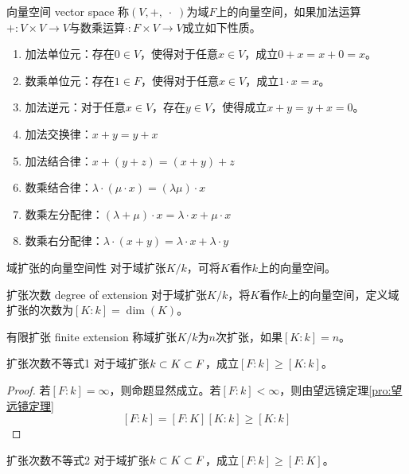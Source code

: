 \begin{definition}{向量空间 vector space}
	称$(V,+,\;\cdot\;)$为域$F$上的向量空间，如果加法运算$+:V\times V\to V$与数乘运算$\cdot:F\times V\to V$成立如下性质。
	\begin{enumerate}
		\item 加法单位元：存在$0\in V$，使得对于任意$x\in V$，成立$0+x=x+0=x$。
		\item 数乘单位元：存在$1\in F$，使得对于任意$x\in V$，成立$1\cdot x=x$。
		\item 加法逆元：对于任意$x\in V$，存在$y\in V$，使得成立$x+y=y+x=0$。
		\item 加法交换律：$x+y=y+x$
		\item 加法结合律：$x+(y+z)=(x+y)+z$
		\item 数乘结合律：$\lambda\cdot (\mu\cdot x)=(\lambda\mu)\cdot x$
		\item 数乘左分配律：$(\lambda+\mu)\cdot x=\lambda \cdot x+\mu \cdot x$
		\item 数乘右分配律：$\lambda\cdot(x+y)=\lambda \cdot x+\lambda \cdot y$
	\end{enumerate}
\end{definition}

\begin{definition}{域扩张的向量空间性}
	对于域扩张$K/k$，可将$K$看作$k$上的向量空间。
\end{definition}

\begin{definition}{扩张次数 degree of extension}
	对于域扩张$K/k$，将$K$看作$k$上的向量空间，定义域扩张的次数为$[K:k]=\dim(K)$。
\end{definition}

\begin{definition}{有限扩张 finite extension}
	称域扩张$K/k$为$n$次扩张，如果$[K:k]=n$。
\end{definition}

\begin{lemma}{}{扩张次数不等式1}
	对于域扩张$k\subset K\subset F$，成立$[F:k]\ge [K:k]$。
\end{lemma}

\begin{proof}
	若$[F:k]=\infty$，则命题显然成立。若$[F:k]<\infty$，则由望远镜定理\ref{pro:望远镜定理}%
	$$
	[F:k]=[F:K][K:k]\ge [K:k]
	$$
\end{proof}

\begin{lemma}{}{扩张次数不等式2}
	对于域扩张$k\subset K\subset F$，成立$[F:k]\ge [F:K]$。
\end{lemma}

